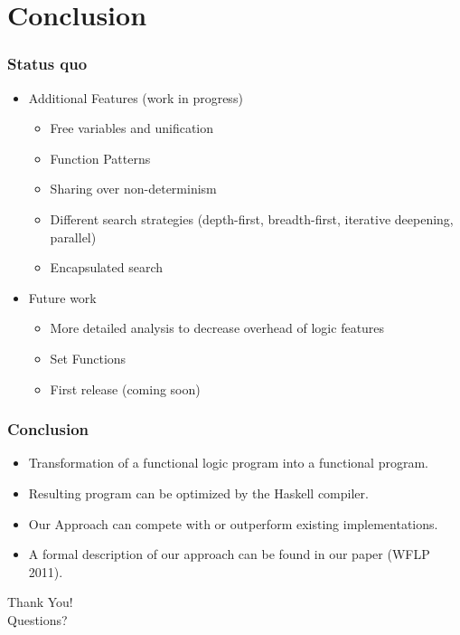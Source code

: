 \documentclass[utf8]{beamer}
\begin{document}
\section{Conclusion}

\begin{frame}
\frametitle{Status quo}
\begin{itemize}
\item Additional Features (work in progress)
\begin{itemize}
\item Free variables and unification
\item Function Patterns
\item Sharing over non-determinism
\item Different search strategies (depth-first, breadth-first, iterative deepening, parallel)
\item Encapsulated search
\end{itemize}
\item Future work
\begin{itemize}
\item More detailed analysis to decrease overhead of logic features
\item Set Functions
\item First release (coming soon)
\end{itemize}
\end{itemize}
\end{frame}


\begin{frame}
\frametitle{Conclusion}
\begin{itemize}
\item Transformation of a functional logic program into a functional program.
\item Resulting program can be optimized by the Haskell compiler.
\item Our Approach can compete with or outperform existing implementations.
\item A formal description of our approach can be found in our paper (WFLP 2011).
\end{itemize}
\end{frame}

\begin{frame}
\begin{center}
{\huge Thank You!}\\[3ex]
\pause
{\huge Questions?}
\end{center}
\end{frame}
\end{document}
